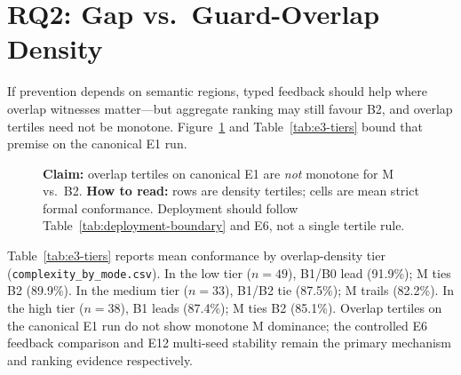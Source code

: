 

\section{RQ2: Gap vs.\ Guard-Overlap Density}
\label{sec:results:rq2}

If prevention depends on semantic regions, typed feedback should help where
overlap witnesses matter---but aggregate ranking may still favour B2, and
overlap tertiles need not be monotone.
Figure~\ref{fig:complexity} and Table~\ref{tab:e3-tiers} bound that premise
on the canonical E1 run.

\begin{figure}[t]
  \centering
  \caption{\textbf{Claim:} overlap tertiles on canonical E1 are \emph{not} monotone
    for M vs.\ B2.
    \textbf{How to read:} rows are density tertiles; cells are mean strict
    formal conformance.  Deployment should follow Table~\ref{tab:deployment-boundary}
    and E6, not a single tertile rule.}
  \label{fig:complexity}
\end{figure}

Table~\ref{tab:e3-tiers} reports mean conformance by overlap-density tier
(\texttt{complexity\_by\_mode.csv}).
In the low tier ($n{=}49$), B1/B0 lead (91.9\%); M ties B2 (89.9\%).
In the medium tier ($n{=}33$), B1/B2 tie (87.5\%); M trails (82.2\%).
In the high tier ($n{=}38$), B1 leads (87.4\%); M ties B2 (85.1\%).
Overlap tertiles on the canonical E1 run do not show monotone M dominance;
the controlled E6 feedback comparison and E12 multi-seed stability remain the
primary mechanism and ranking evidence respectively.

\begin{table}[H]
  \caption{E3: mean strict conformance by overlap-density tier (E1, $n$ per cell).}
  \label{tab:e3-tiers}
  \centering
\end{table}

